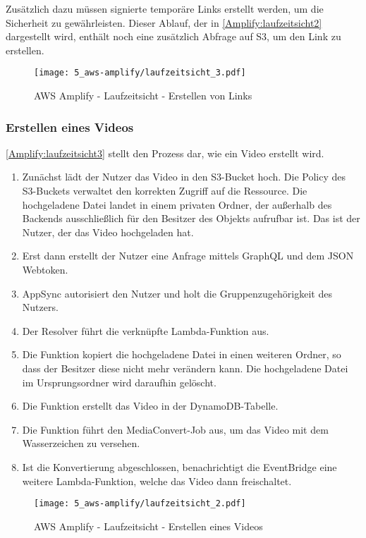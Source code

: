 Zusätzlich dazu müssen signierte temporäre Links erstellt werden, um die Sicherheit zu gewährleisten. Dieser Ablauf, der in \autoref{Amplify:laufzeitsicht2} dargestellt wird, enthält noch eine zusätzlich Abfrage auf S3, um den Link zu erstellen.

\begin{figure}
  \centering
  \texttt{[image: 5\_aws-amplify/laufzeitsicht\_3.pdf]}
  \caption{AWS Amplify - Laufzeitsicht - Erstellen von Links}
  \label{Amplify:laufzeitsicht2}
\end{figure}

\subsubsection{Erstellen eines Videos}

\autoref{Amplify:laufzeitsicht3} stellt den Prozess dar, wie ein Video erstellt wird.
\begin{enumerate}
  \item{Zunächst lädt der Nutzer das Video in den S3-Bucket hoch. Die Policy des S3-Buckets verwaltet den korrekten Zugriff auf die Ressource. Die hochgeladene Datei landet in einem privaten Ordner, der außerhalb des Backends ausschließlich für den Besitzer des Objekts aufrufbar ist. Das ist der Nutzer, der das Video hochgeladen hat.}
  \item{Erst dann erstellt der Nutzer eine Anfrage mittels GraphQL und dem JSON Webtoken.}
  \item{AppSync autorisiert den Nutzer und holt die Gruppenzugehörigkeit des Nutzers.}
  \item{Der Resolver führt die verknüpfte Lambda-Funktion aus.}
  \item{Die Funktion kopiert die hochgeladene Datei in einen weiteren Ordner, so dass der Besitzer diese nicht mehr verändern kann. Die hochgeladene Datei im Ursprungsordner wird daraufhin gelöscht.}
  \item{Die Funktion erstellt das Video in der DynamoDB-Tabelle.}
  \item{Die Funktion führt den MediaConvert-Job aus, um das Video mit dem Wasserzeichen zu versehen.}
  \item{Ist die Konvertierung abgeschlossen, benachrichtigt die EventBridge eine weitere Lambda-Funktion, welche das Video dann freischaltet.}
\end{enumerate}

\begin{figure}
  \centering
  \texttt{[image: 5\_aws-amplify/laufzeitsicht\_2.pdf]}
  \caption{AWS Amplify - Laufzeitsicht - Erstellen eines Videos}
  \label{Amplify:laufzeitsicht3}
\end{figure}

